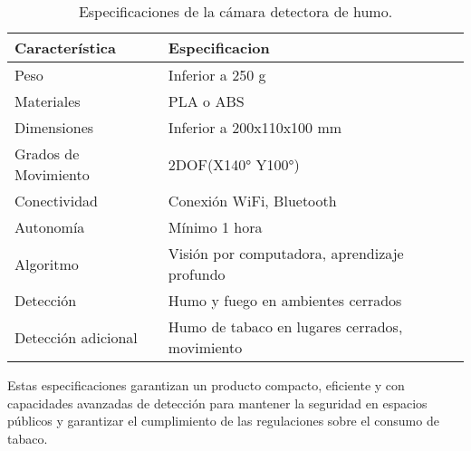 \begin{table}[H]
\centering
\begin{tabular}{|l|l|}
\hline
\textbf{Característica} & \textbf{Especificacion}            \\ \hline
Peso                    & Inferior a 250 g                  \\ \hline
Materiales              & PLA o ABS                         \\ \hline
Dimensiones             & Inferior a 200x110x100 mm         \\ \hline
Grados de Movimiento    & 2DOF(X140° Y100°)                 \\ \hline
Conectividad            & Conexión WiFi, Bluetooth          \\ \hline
Autonomía               & Mínimo 1 hora                     \\ \hline
Algoritmo               & Visión por computadora, aprendizaje profundo  \\ \hline
Detección               & Humo y fuego en ambientes cerrados \\ \hline
Detección adicional     & Humo de tabaco en lugares cerrados, movimiento \\
\hline
\end{tabular}
\caption{Especificaciones de la cámara detectora de humo.}
\label{tab:fire_detection_specs}
\end{table}

Estas especificaciones garantizan un producto compacto, eficiente y con capacidades avanzadas de detección para mantener la seguridad en espacios públicos y garantizar el cumplimiento de las regulaciones sobre el consumo de tabaco.